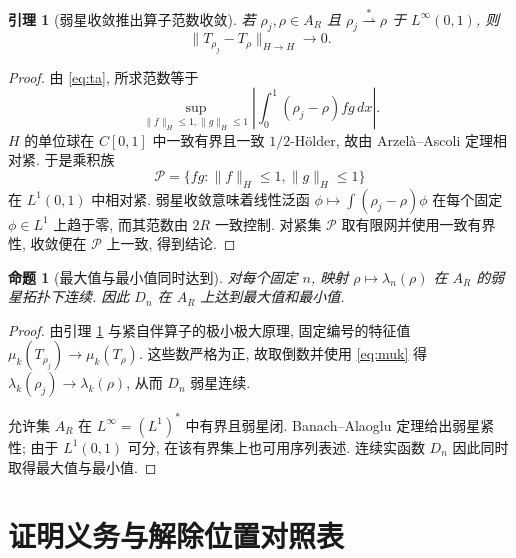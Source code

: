\documentclass[UTF8]{ctexart}
\newtheorem{proposition}[theorem]{命题}
\newtheorem{lemma}[theorem]{引理}
\begin{document}
\begin{lemma}[弱星收敛推出算子范数收敛]\label{lem:opnorm}
若 $\rho_j,\rho\in A_R$ 且 $\rho_j\overset{*}{\rightharpoonup}\rho$ 于 $L^\infty(0,1)$, 则
\begin{equation*}
	\|T_{\rho_j}-T_\rho\|_{H\to H}\to0 .
\end{equation*}
\end{lemma}

\begin{proof}
由 \eqref{eq:ta}, 所求范数等于
\begin{equation*}
	\sup_{\|f\|_H\le1,\|g\|_H\le1}\left|\int_0^1(\rho_j-\rho)fg\,dx\right| .
\end{equation*}
$H$ 的单位球在 $C[0,1]$ 中一致有界且一致 $1/2$-H\"older, 故由 Arzel\`a--Ascoli 定理相对紧.
于是乘积族
\begin{equation*}
	\mathcal P=\{fg:\|f\|_H\le1,\|g\|_H\le1\}
\end{equation*}
在 $L^1(0,1)$ 中相对紧. 弱星收敛意味着线性泛函 $\phi\mapsto\int(\rho_j-\rho)\phi$ 在每个固定
$\phi\in L^1$ 上趋于零, 而其范数由 $2R$ 一致控制. 对紧集 $\mathcal P$ 取有限网并使用一致有界性,
收敛便在 $\mathcal P$ 上一致, 得到结论.
\end{proof}

\begin{proposition}[最大值与最小值同时达到]\label{prop:attain}
对每个固定 $n$, 映射 $\rho\mapsto\lambda_n(\rho)$ 在 $A_R$ 的弱星拓扑下连续. 因此 $D_n$ 在
$A_R$ 上达到最大值和最小值.
\end{proposition}

\begin{proof}
由引理 \ref{lem:opnorm} 与紧自伴算子的极小极大原理, 固定编号的特征值 $\mu_k(T_{\rho_j})\to
\mu_k(T_\rho)$. 这些数严格为正, 故取倒数并使用 \eqref{eq:muk} 得 $\lambda_k(\rho_j)\to
\lambda_k(\rho)$, 从而 $D_n$ 弱星连续.

允许集 $A_R$ 在 $L^\infty=(L^1)^*$ 中有界且弱星闭. Banach--Alaoglu 定理给出弱星紧性; 由于
$L^1(0,1)$ 可分, 在该有界集上也可用序列表述. 连续实函数 $D_n$ 因此同时取得最大值与最小值.
\end{proof}

\section{证明义务与解除位置对照表}
\end{document}
